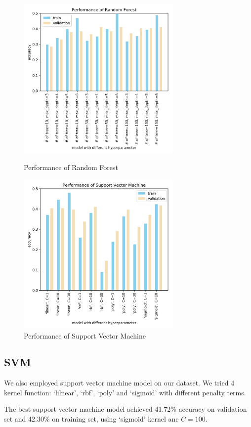 \documentclass[a4paper, 11pt]{article}
\begin{document}
\begin{figure}[!h]
\centering
\begin{minipage}[t]{0.48\textwidth}
\centering
\includegraphics[width=8cm]{image/rf.jpg}
\caption{\label{fig:rf}Performance of Random Forest}
\end{minipage}
\begin{minipage}[t]{0.48\textwidth}
\centering
\includegraphics[width=8cm]{image/svm.jpg}
\caption{\label{fig:svm}Performance of Support Vector Machine}
\end{minipage}
\end{figure}

\subsection*{SVM}

We also employed support vector machine model on our dataset. We tried 4 kernel function: `lilnear', `rbf', `poly' and `sigmoid' with different penalty terms.

The best support vector machine model achieved 41.72\% accuracy on validation set and 42.30\% on training set, using `sigmoid' kernel anc $C=100$.
\end{document}
